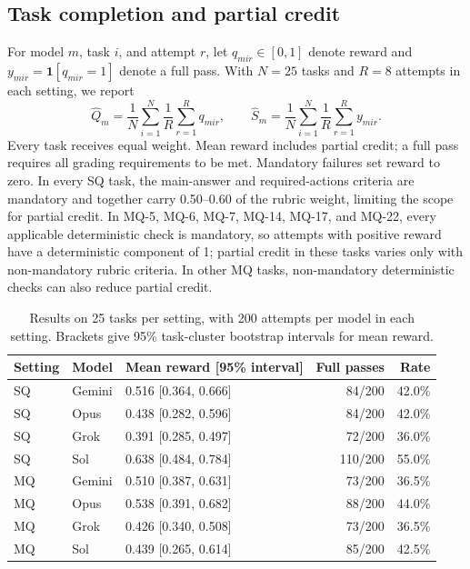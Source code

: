 \documentclass[11pt,letterpaper]{article}
\begin{document}
\subsection{Task completion and partial credit}
For model $m$, task $i$, and attempt $r$, let $q_{mir}\in[0,1]$ denote reward and $y_{mir}=\mathbf{1}[q_{mir}=1]$ denote a full pass. With $N=25$ tasks and $R=8$ attempts in each setting, we report
\begin{equation}
\widehat Q_m=\frac{1}{N}\sum_{i=1}^{N}\frac{1}{R}\sum_{r=1}^{R}q_{mir},\qquad
\widehat S_m=\frac{1}{N}\sum_{i=1}^{N}\frac{1}{R}\sum_{r=1}^{R}y_{mir}.
\end{equation}
Every task receives equal weight. Mean reward includes partial credit; a full pass requires all grading requirements to be met. Mandatory failures set reward to zero. In every SQ task, the main-answer and required-actions criteria are mandatory and together carry 0.50--0.60 of the rubric weight, limiting the scope for partial credit. In MQ-5, MQ-6, MQ-7, MQ-14, MQ-17, and MQ-22, every applicable deterministic check is mandatory, so attempts with positive reward have a deterministic component of 1; partial credit in these tasks varies only with non-mandatory rubric criteria. In other MQ tasks, non-mandatory deterministic checks can also reduce partial credit.

\begin{table}[H]\centering\small
\caption{Results on 25 tasks per setting, with 200 attempts per model in each setting. Brackets give 95\% task-cluster bootstrap intervals for mean reward.}\label{tab:cohort}
\begin{tabularx}{\linewidth}{@{}llYrr@{}}\toprule
Setting & Model & Mean reward [95\% interval] & Full passes & Rate\\\midrule
SQ & Gemini & 0.516 [0.364, 0.666] & 84/200 & 42.0\%\\
SQ & Opus & 0.438 [0.282, 0.596] & 84/200 & 42.0\%\\
SQ & Grok & 0.391 [0.285, 0.497] & 72/200 & 36.0\%\\
SQ & Sol & 0.638 [0.484, 0.784] & 110/200 & 55.0\%\\
\midrule
MQ & Gemini & 0.510 [0.387, 0.631] & 73/200 & 36.5\%\\
MQ & Opus & 0.538 [0.391, 0.682] & 88/200 & 44.0\%\\
MQ & Grok & 0.426 [0.340, 0.508] & 73/200 & 36.5\%\\
MQ & Sol & 0.439 [0.265, 0.614] & 85/200 & 42.5\%\\
\bottomrule\end{tabularx}\end{table}
\end{document}
